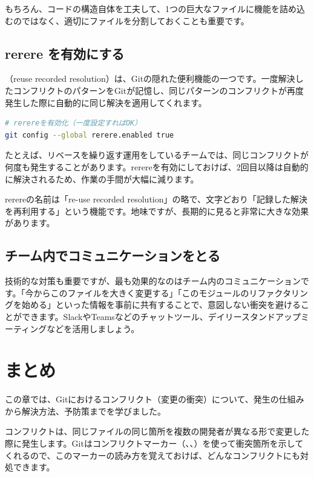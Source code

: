 もちろん、コードの構造自体を工夫して、1つの巨大なファイルに機能を詰め込むのではなく、適切にファイルを分割しておくことも重要です。

\subsection{rerere を有効にする}

（reuse recorded resolution）は、Gitの隠れた便利機能の一つです。一度解決したコンフリクトのパターンをGitが記憶し、同じパターンのコンフリクトが再度発生した際に自動的に同じ解決を適用してくれます。

\begin{lstlisting}[language=bash]
# rerereを有効化（一度設定すればOK）
git config --global rerere.enabled true
\end{lstlisting}

たとえば、リベースを繰り返す運用をしているチームでは、同じコンフリクトが何度も発生することがあります。rerereを有効にしておけば、2回目以降は自動的に解決されるため、作業の手間が大幅に減ります。

rerereの名前は「re-use recorded resolution」の略で、文字どおり「記録した解決を再利用する」という機能です。地味ですが、長期的に見ると非常に大きな効果があります。

\subsection{チーム内でコミュニケーションをとる}

技術的な対策も重要ですが、最も効果的なのはチーム内のコミュニケーションです。「今からこのファイルを大きく変更する」「このモジュールのリファクタリングを始める」といった情報を事前に共有することで、意図しない衝突を避けることができます。SlackやTeamsなどのチャットツール、デイリースタンドアップミーティングなどを活用しましょう。

\section{まとめ}

この章では、Gitにおけるコンフリクト（変更の衝突）について、発生の仕組みから解決方法、予防策までを学びました。

コンフリクトは、同じファイルの同じ箇所を複数の開発者が異なる形で変更した際に発生します。Gitはコンフリクトマーカー（\cmd{<<<<<<<}、\cmd{=======}、\cmd{>>>>>>>}）を使って衝突箇所を示してくれるので、このマーカーの読み方を覚えておけば、どんなコンフリクトにも対処できます。

